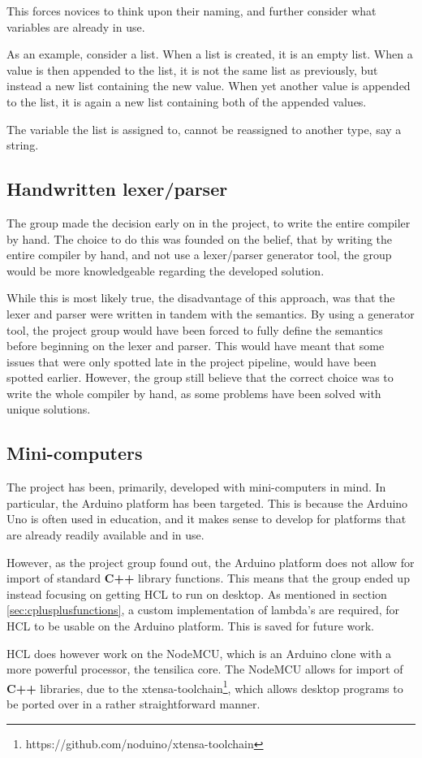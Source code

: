 This forces novices to think upon their naming, and further consider what variables are already in use.

As an example, consider a list.
When a list is created, it is an empty list.
When a value is then appended to the list, it is not the same list as previously, but instead a new list containing the new value.
When yet another value is appended to the list, it is again a new list containing both of the appended values.

The variable the list is assigned to, cannot be reassigned to another type, say a string.

\subsection{Handwritten lexer/parser}
The group made the decision early on in the project, to write the entire compiler by hand.
The choice to do this was founded on the belief, that by writing the entire compiler by hand, and not use a lexer/parser generator tool, the group would be more knowledgeable regarding the developed solution.

While this is most likely true, the disadvantage of this approach, was that the lexer and parser were written in tandem with the semantics.
By using a generator tool, the project group would have been forced to fully define the semantics before beginning on the lexer and parser.
This would have meant that some issues that were only spotted late in the project pipeline, would have been spotted earlier.
However, the group still believe that the correct choice was to write the whole compiler by hand, as some problems have been solved with unique solutions.

\subsection{Mini-computers}
The project has been, primarily, developed with mini-computers in mind.
In particular, the Arduino platform has been targeted.
This is because the Arduino Uno is often used in education, and it makes sense to develop for platforms that are already readily available and in use.

However, as the project group found out, the Arduino platform does not allow for import of standard \textbf{C++} library functions.
This means that the group ended up instead focusing on getting HCL to run on desktop.
As mentioned in section \ref{sec:cplusplusfunctions}, a custom implementation of lambda's are required, for HCL to be usable on the Arduino platform.
This is saved for future work.

HCL does however work on the NodeMCU, which is an Arduino clone with a more powerful processor, the tensilica core.
The NodeMCU allows for import of \textbf{C++} libraries, due to the xtensa-toolchain\footnote{https://github.com/noduino/xtensa-toolchain}, which allows desktop programs to be ported over in a rather straightforward manner.


